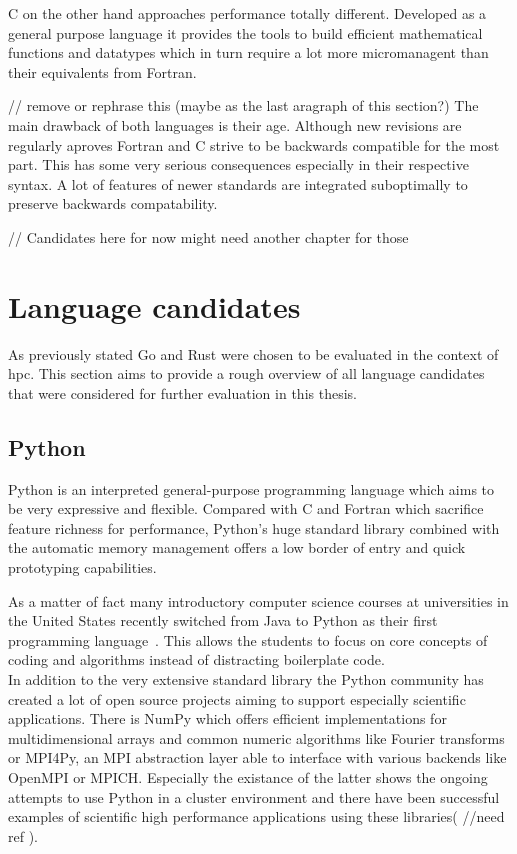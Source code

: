 C on the other hand approaches performance totally different. Developed as a general purpose language it provides the tools to build efficient mathematical functions and datatypes which in turn require a lot more micromanagent than their equivalents from Fortran.


// remove or rephrase this (maybe as the last aragraph of this section?)
The main drawback of both languages is their age. Although new revisions are regularly aproves Fortran and C strive to be backwards compatible for the most part. This has some very serious consequences especially in their respective syntax. A lot of features of newer standards are integrated suboptimally to preserve backwards compatability.


// Candidates here for now might need another chapter for those
\section{Language candidates}
\label{sec:State_of_the_art::Candidates}

As previously stated Go and Rust were chosen to be evaluated in the context of \gls{hpc}. This section aims to provide a rough overview of all language candidates that were considered for further evaluation in this thesis.

\subsection*{Python}
\label{subsec:State_of_the_art::Candidates::Python}

Python is an interpreted general-purpose programming language which aims to be very expressive and flexible. Compared with C and Fortran which sacrifice feature richness for performance, Python's huge standard library combined with the automatic memory management offers a low border of entry and quick prototyping capabilities.

As a matter of fact many introductory computer science courses at universities in the United States recently switched from Java to Python as their first programming language~\cite{GUO14, intro_py}. This allows the students to focus on core concepts of coding and algorithms instead of distracting boilerplate code.
\\


In addition to the very extensive standard library the Python community has created a lot of open source projects aiming to support especially scientific applications. There is NumPy which offers efficient implementations for multidimensional arrays and common numeric algorithms like Fourier transforms or MPI4Py, an \gls{MPI} abstraction layer able to interface with various backends like OpenMPI or MPICH. Especially the existance of the latter shows the ongoing attempts to use Python in a cluster environment and there have been successful examples of scientific high performance applications using these libraries( //need ref ).

